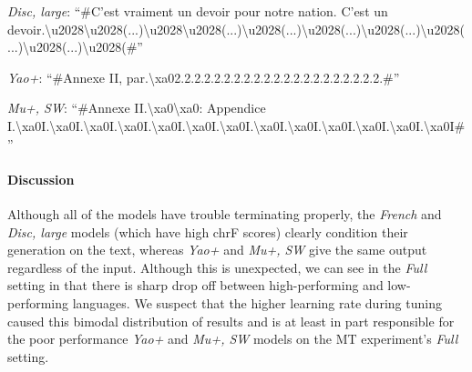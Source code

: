 \emph{Disc, large}:
``\#C'est vraiment un devoir pour notre nation. C'est un devoir.\textbackslash{}u2028\allowbreak{}\textbackslash{}u2028(...)\allowbreak{}\textbackslash{}u2028\allowbreak{}\textbackslash{}u2028(...)\allowbreak{}\textbackslash{}u2028(...)\allowbreak{}\textbackslash{}u2028(...)\allowbreak{}\textbackslash{}u2028(...)\allowbreak{}\textbackslash{}u2028(...)\allowbreak{}\textbackslash{}u2028(...)\allowbreak{}\textbackslash{}u2028(\#''

\emph{Yao+}:
``\#Annexe II, par.\allowbreak{}\textbackslash{}xa02.\allowbreak{}2.\allowbreak{}2.\allowbreak{}2.\allowbreak{}2.\allowbreak{}2.\allowbreak{}2.\allowbreak{}2.\allowbreak{}2.\allowbreak{}2.\allowbreak{}2.\allowbreak{}2.\allowbreak{}2.\allowbreak{}2.\allowbreak{}2.\allowbreak{}2.\allowbreak{}2.\allowbreak{}2.\allowbreak{}2.\allowbreak{}2.\allowbreak{}2.\allowbreak{}\#''

\emph{Mu+, SW}:
``\#Annexe II.\allowbreak{}\textbackslash{}xa0\allowbreak{}\textbackslash{}xa0: Appendice I.\allowbreak{}\textbackslash{}xa0I.\allowbreak{}\textbackslash{}xa0I.\allowbreak{}\textbackslash{}xa0I.\allowbreak{}\textbackslash{}xa0I.\allowbreak{}\textbackslash{}xa0I.\allowbreak{}\textbackslash{}xa0I.\allowbreak{}\textbackslash{}xa0I.\allowbreak{}\textbackslash{}xa0I.\allowbreak{}\textbackslash{}xa0I.\allowbreak{}\textbackslash{}xa0I.\allowbreak{}\textbackslash{}xa0I.\allowbreak{}\textbackslash{}xa0I.\allowbreak{}\textbackslash{}xa0I\#''

\paragraph{Discussion}
Although all of the models have trouble terminating properly, the \emph{French} and \emph{Disc, large} models (which have high chrF scores) clearly condition their generation on the text, whereas \emph{Yao+} and \emph{Mu+, SW} give the same output regardless of the input.
Although this is unexpected, we can see in the \emph{Full} setting in  that there is sharp drop off between high-performing and low-performing languages.
We suspect that the higher learning rate during tuning caused this bimodal distribution of results and is at least in part responsible for the poor performance \emph{Yao+} and \emph{Mu+, SW} models on the MT experiment's \emph{Full} setting.



